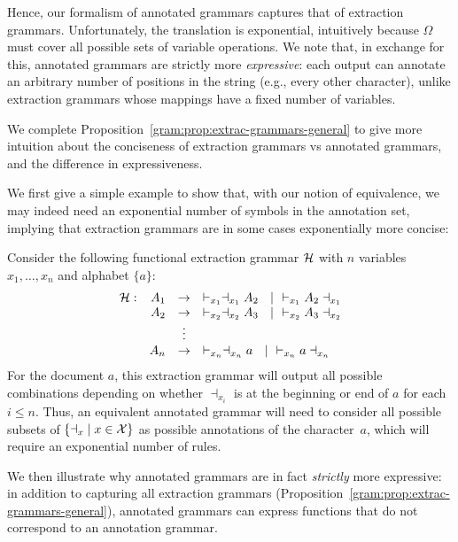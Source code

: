 Hence, our formalism of annotated grammars captures that of extraction grammars.
%
Unfortunately, the translation is exponential, 
intuitively because $\Omega$ must cover all possible sets of variable operations.
We note that, in exchange for this, annotated grammars
are strictly more \emph{expressive}: each output can annotate an arbitrary
number of positions in the string (e.g., every other character), unlike
extraction grammars whose mappings have a fixed number of variables.

We complete Proposition~\ref{gram:prop:extrac-grammars-general} to give more
intuition about the conciseness of extraction grammars vs annotated grammars,
and the difference in expressiveness.

We first give a simple example to show that, with our notion of equivalence,
we may indeed need an exponential number of symbols in the annotation set, implying that extraction grammars are in some cases exponentially more concise:

%
\begin{example}
Consider the following functional extraction grammar $\mathcal{H}$ with $n$ variables $x_1, \ldots, x_n$ and alphabet $\{a\}$:
  \[
\begin{array}{rrcl}
	\cH: & A_1 & \rightarrow &  \vdash_{x_1} \dashv_{x_1} A_2 \ \ \mid \ \ \vdash_{x_1} A_2 \dashv_{x_1} \\
	&  A_2 & \rightarrow &  \vdash_{x_2} \dashv_{x_2} A_3 \ \ \mid \ \ \vdash_{x_2} A_3 \dashv_{x_2} \\
	&  & \vdots & \\
	&  A_{n} & \rightarrow &  \vdash_{x_n} \dashv_{x_n} a \ \ \mid  \ \ \vdash_{x_n} a \dashv_{x_n} \\
\end{array}
\]
For the document $a$, this extraction grammar will output all possible combinations depending on whether $\dashv_{x_i}$ is at the beginning or end of $a$ for each $i \leq n$. Thus, an equivalent annotated grammar will need to consider all possible subsets of $\{ {\dashv_x} \mid x\in \mathcal{X}\}$ as possible annotations of the character~$a$, which will require an exponential number of rules.
\end{example}

We then illustrate why annotated grammars are in fact \emph{strictly} more
expressive: in addition to capturing all extraction grammars
(Proposition~\ref{gram:prop:extrac-grammars-general}),
annotated grammars can express functions that do not correspond to an annotation grammar.

